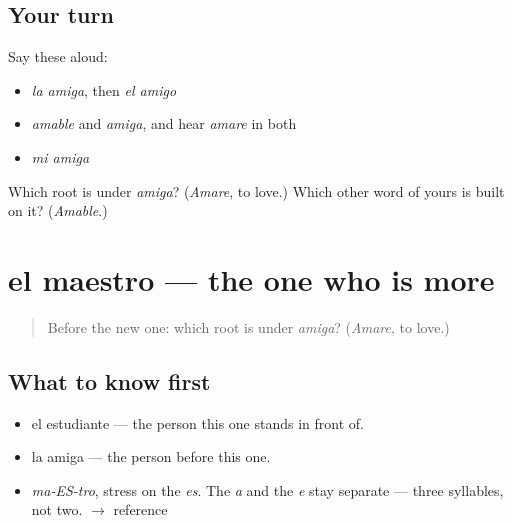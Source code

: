 \subsection*{Your turn}
Say these aloud:

\begin{itemize}
\raggedright
  \item \emph{la amiga}, then \emph{el amigo}
  \item \emph{amable} and \emph{amiga}, and hear \emph{amare} in both
  \item \emph{mi amiga}
\end{itemize}

\begin{tcolorbox}[breakable,colback=teal!4,colframe=teal!35!black,title={Before you move on}]
Which root is under \emph{amiga}? (\emph{Amare}, to love.) Which other word of yours is built on it? (\emph{Amable}.)
\end{tcolorbox}
\section[el maestro]{el maestro — the one who is more}

\label{lesson:ES-C285-maestro}



\begin{quote}
Before the new one: which root is under \emph{amiga}? (\emph{Amare}, to love.)
\end{quote}

\subsection*{What to know first}
\begin{itemize}
\raggedright
  \item el estudiante — the person this one stands in front of.
  \item la amiga — the person before this one.
\end{itemize}

\begin{sounds}
\begin{itemize}
\raggedright
  \item \emph{ma-ES-tro}, stress on the \emph{es}. The \emph{a} and the \emph{e} stay separate — three syllables, not two. $\to$ reference
\end{itemize}
\end{sounds}

